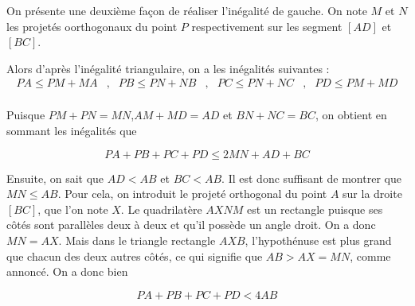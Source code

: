 \begin{center}
\end{center}

On présente une deuxième façon de réaliser l'inégalité de gauche. On note $M$ et $N$ les projetés oorthogonaux du point $P$ respectivement sur les segment $[AD]$ et $[BC]$.

Alors d'après l'inégalité triangulaire, on a les inégalités suivantes :
$$\begin{array}{llllllll}
PA\le PM+MA &,& PB\le PN+NB &,& PC \le PN+NC&,&PD\le PM+MD\\
\end{array}$$

Puisque $PM+PN=MN$,$AM+MD=AD$ et $BN+NC=BC$, on obtient en sommant les inégalités que

$$ PA+PB+PC+PD \le 2MN+AD+BC$$

Ensuite, on sait que $AD< AB$ et $BC<AB$. Il est donc suffisant de montrer que $MN\le AB$. Pour cela, on introduit le projeté orthogonal du point $A$ sur la droite $[BC]$, que l'on note $X$. Le quadrilatère $AXNM$ est un rectangle puisque ses côtés sont parallèles deux à deux et qu'il possède un angle droit. On a donc $MN=AX$. Mais dans le triangle rectangle $AXB$, l'hypothénuse est plus grand que chacun des deux autres côtés, ce qui signifie que $AB>AX=MN$, comme annoncé. On a donc bien

$$PA+PB+PC+PD < 4AB$$
